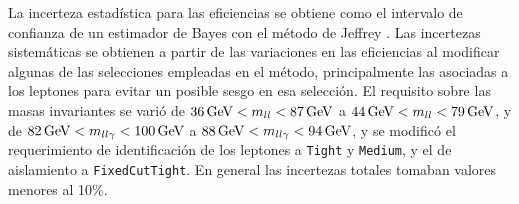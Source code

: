 La incerteza estadística para las eficiencias se obtiene como el intervalo de confianza de un estimador de Bayes con el método de Jeffrey \cite{Casadei_2012}.
Las incertezas sistemáticas se obtienen a partir de las variaciones en las eficiencias al modificar algunas de las selecciones empleadas en el método, principalmente las asociadas a los leptones para evitar un posible sesgo en esa selección. El requisito sobre las masas invariantes se varió de $36\,\text{GeV}<m_{ll}<87\,\text{GeV}$ a $44\,\text{GeV}<m_{ll}<79\,\text{GeV}$, y de 
$82\,\text{GeV}<m_{ll\gamma}<100\,\text{GeV}$ a $88\,\text{GeV}<m_{ll\gamma}<94\,\text{GeV}$, y se modificó el requerimiento de identificación de los leptones a \texttt{Tight} y \texttt{Medium}, y el de aislamiento a \texttt{FixedCutTight}. En general las incertezas totales tomaban valores menores al 10\%.






